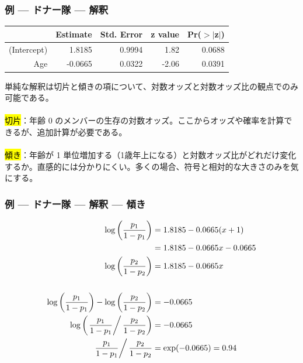 \begin{frame}
\frametitle{例 --- ドナー隊 --- 解釈}

{\scriptsize
\begin{center}
\begin{tabular}{rrrrr}
  \hline
 & Estimate & Std. Error & z value & Pr($>$$|$z$|$) \\
  \hline
(Intercept) & 1.8185 & 0.9994 & 1.82 & 0.0688 \\
  Age & -0.0665 & 0.0322 & -2.06 & 0.0391 \\
   \hline
\end{tabular}
\end{center}
}

単純な解釈は切片と傾きの項について、対数オッズと対数オッズ比の観点でのみ可能である。\\

~\\

\hl{切片}：年齢 0 のメンバーの生存の対数オッズ。ここからオッズや確率を計算できるが、追加計算が必要である。\\

~\\

\hl{傾き}：年齢が 1 単位増加する（1歳年上になる）と対数オッズ比がどれだけ変化するか。直感的には分かりにくい。多くの場合、符号と相対的な大きさのみを気にする。

\end{frame}


\begin{frame}[fragile]
\frametitle{例 --- ドナー隊 --- 解釈 --- 傾き}

{\scriptsize
\begin{align*}
\log\left(\frac{p_1}{1-p_1}\right) &= 1.8185-0.0665 (x+1) \\
                                   &= 1.8185-0.0665 x-0.0665 \\
\log\left(\frac{p_2}{1-p_2}\right) &= 1.8185-0.0665 x \\
\\
\log\left(\frac{p_1}{1-p_1}\right) - \log\left(\frac{p_2}{1-p_2}\right) &= -0.0665 \\
\log\left(\left. \frac{p_1}{1-p_1} \right/ \frac{p_2}{1-p_2} \right) &= -0.0665 \\
\left. \frac{p_1}{1-p_1} \right/ \frac{p_2}{1-p_2} &= \exp(-0.0665) = 0.94
\end{align*}
}

\end{frame}

